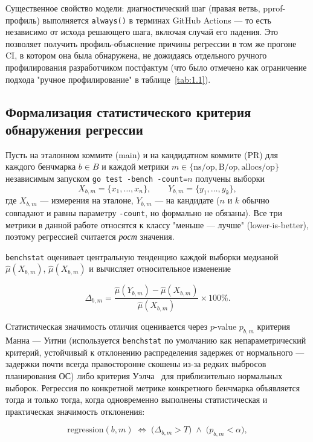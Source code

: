 \documentclass[12pt,a4paper]{article}
\numberwithin{equation}{section}
\begin{document}
Существенное свойство модели: диагностический шаг (правая ветвь,
pprof-профиль) выполняется \texttt{always()} в терминах GitHub Actions —
то есть независимо от исхода решающего шага, включая случай его падения. Это
позволяет получить профиль-объяснение причины регрессии в том же прогоне
CI, в котором она была обнаружена, не дожидаясь отдельного ручного
профилирования разработчиком постфактум (что было отмечено как ограничение
подхода "ручное профилирование" в таблице~\ref{tab:1.1}).

\subsection{Формализация статистического критерия обнаружения регрессии}
\label{sec:2.2}

Пусть на эталонном коммите (main) и на кандидатном коммите (PR) для каждого
бенчмарка $b \in B$ и каждой метрики $m \in \{\text{ns/op}, \text{B/op},
\text{allocs/op}\}$ независимым запуском \texttt{go test -bench -count=$n$}
получены выборки
$$
X_{b,m} = \{x_1, \dots, x_n\}, \qquad Y_{b,m} = \{y_1, \dots, y_k\},
$$
где $X_{b,m}$ — измерения на эталоне, $Y_{b,m}$ — на кандидате
($n$ и $k$ обычно совпадают и равны параметру \texttt{-count}, но формально
не обязаны). Все три метрики в данной работе относятся к классу
"меньше — лучше" (lower-is-better), поэтому регрессией считается
\emph{рост} значения.

\texttt{benchstat} оценивает центральную тенденцию каждой выборки медианой
$\hat\mu(X_{b,m})$, $\hat\mu(X_{b,m})$ и вычисляет относительное изменение

\begin{equation}
\Delta_{b,m} = \frac{\hat\mu(Y_{b,m}) - \hat\mu(X_{b,m})}{\hat\mu(X_{b,m})} \times 100\%.
\label{eq:delta}
\end{equation}

Статистическая значимость отличия оценивается через $p$-value
$p_{b,m}$ критерия Манна --- Уитни (используется \texttt{benchstat} по
умолчанию как непараметрический критерий, устойчивый к отклонению
распределения задержек от нормального — задержки почти всегда
правосторонне скошены из-за редких выбросов планирования ОС) либо критерия
Уэлча~\cite{welch1947} для приблизительно нормальных выборок. Регрессия по
конкретной метрике конкретного бенчмарка объявляется тогда и только тогда,
когда одновременно выполнены статистическая и практическая значимость
отклонения:

\begin{equation}
\mathrm{regression}(b, m) \;\Longleftrightarrow\; \bigl(\Delta_{b,m} > T\bigr) \;\wedge\; \bigl(p_{b,m} < \alpha\bigr),
\label{eq:criterion}
\end{equation}
\end{document}
